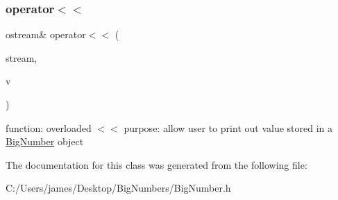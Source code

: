 \subsubsection{\texorpdfstring{operator$<$$<$}{operator<<}}
{\footnotesize\ttfamily ostream\& operator$<$$<$ (\begin{DoxyParamCaption}\item[{ostream \&}]{stream,  }\item[{const \mbox{\hyperlink{class_big_number}{Big\+Number}} \&}]{v }\end{DoxyParamCaption})\hspace{0.3cm}{\ttfamily [friend]}}

function\+: overloaded $<$$<$ purpose\+: allow user to print out value stored in a \mbox{\hyperlink{class_big_number}{Big\+Number}} object 

The documentation for this class was generated from the following file\+:\begin{DoxyCompactItemize}
\item 
C\+:/\+Users/james/\+Desktop/\+Big\+Numbers/Big\+Number.\+h\end{DoxyCompactItemize}
